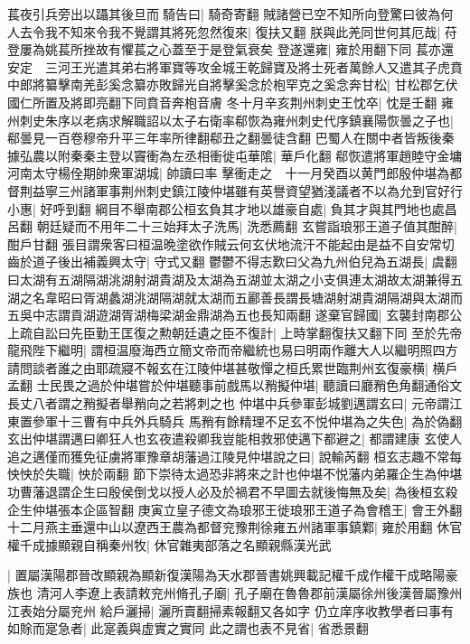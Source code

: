 萇夜引兵旁出以躡其後旦而騎告曰|{
	騎奇寄翻}
賊諸營已空不知所向登驚曰彼為何人去令我不知來令我不覺謂其將死忽然復來|{
	復扶又翻}
朕與此羌同世何其厄哉|{
	苻登屢為姚萇所挫故有懼萇之心蓋至于是登氣衰矣}
登遂還雍|{
	雍於用翻下同}
萇亦還安定　三河王光遣其弟右將軍寶等攻金城王乾歸寶及將士死者萬餘人又遣其子虎賁中郎將纂擊南羌彭奚念纂亦敗歸光自將擊奚念於枹罕克之奚念奔甘松|{
	甘松郡乞伏國仁所置及將即亮翻下同賁音奔枹音膚}
冬十月辛亥荆州刺史王忱卒|{
	忱是壬翻}
雍州刺史朱序以老病求解職詔以太子右衛率郗恢為雍州刺史代序鎮襄陽恢曇之子也|{
	郗曇見一百卷穆帝升平三年率所律翻郗丑之翻曇徒含翻}
巴蜀人在關中者皆叛後秦據弘農以附秦秦主登以竇衝為左丞相衝徙屯華隂|{
	華戶化翻}
郗恢遣將軍趙睦守金墉河南太守楊佺期帥衆軍湖城|{
	帥讀曰率}
擊衝走之　十一月癸酉以黄門郎殷仲堪為都督荆益寧三州諸軍事荆州刺史鎮江陵仲堪雖有英譽資望猶淺議者不以為允到官好行小惠|{
	好呼到翻}
綱目不舉南郡公桓玄負其才地以雄豪自處|{
	負其才與其門地也處昌呂翻}
朝廷疑而不用年二十三始拜太子洗馬|{
	洗悉薦翻}
玄嘗詣琅邪王道子值其酣醉|{
	酣戶甘翻}
張目謂衆客曰桓温晩塗欲作賊云何玄伏地流汗不能起由是益不自安常切齒於道子後出補義興太守|{
	守式又翻}
鬱鬱不得志歎曰父為九州伯兒為五湖長|{
	虞翻曰太湖有五湖隔湖洮湖射湖貴湖及太湖為五湖並太湖之小支俱連太湖故太湖兼得五湖之名韋昭曰胥湖蠡湖洮湖隔湖就太湖而五酈善長謂長塘湖射湖貴湖隔湖與太湖而五吳中志謂貢湖遊湖胥湖梅梁湖金鼎湖為五也長知兩翻}
遂棄官歸國|{
	玄襲封南郡公}
上疏自訟曰先臣勤王匡復之勲朝廷遺之臣不復計|{
	上時掌翻復扶又翻下同}
至於先帝龍飛陛下繼明|{
	謂桓温廢海西立簡文帝而帝繼統也易曰明兩作離大人以繼明照四方}
請問談者誰之由耶疏寢不報玄在江陵仲堪甚敬憚之桓氏累世臨荆州玄復豪横|{
	横戶孟翻}
士民畏之過於仲堪嘗於仲堪聽事前戲馬以矟擬仲堪|{
	聽讀曰廳矟色角翻通俗文長丈八者謂之矟擬者舉矟向之若將刺之也}
仲堪中兵參軍彭城劉邁謂玄曰|{
	元帝謂江東置參軍十三曹有中兵外兵騎兵}
馬矟有餘精理不足玄不悦仲堪為之失色|{
	為於偽翻}
玄出仲堪謂邁曰卿狂人也玄夜遣殺卿我豈能相救邪使邁下都避之|{
	都謂建康}
玄使人追之邁僅而獲免征虜將軍豫章胡藩過江陵見仲堪說之曰|{
	說輸芮翻}
桓玄志趣不常每怏怏於失職|{
	怏於兩翻}
節下崇待太過恐非將來之計也仲堪不悦藩内弟羅企生為仲堪功曹藩退謂企生曰殷侯倒戈以授人必及於禍君不早圖去就後悔無及矣|{
	為後桓玄殺企生仲堪張本企區智翻}
庚寅立皇子德文為琅邪王徙琅邪王道子為會稽王|{
	會王外翻}
十二月燕主垂還中山以遼西王農為都督兖豫荆徐雍五州諸軍事鎮鄴|{
	雍於用翻}
休官權千成據顯親自稱秦州牧|{
	休官雜夷部落之名顯親縣漢光武}


|{
	置屬漢陽郡晉改顯親為顯新復漢陽為天水郡晉書姚興載記權千成作權干成略陽豪族也}
清河人李遼上表請敕兖州脩孔子廟|{
	孔子廟在魯魯郡前漢屬徐州後漢晉屬豫州江表始分屬兖州}
給戶灑掃|{
	灑所賣翻掃素報翻又各如字}
仍立庠序收教學者曰事有如賖而寔急者|{
	此寔義與虚實之實同}
此之謂也表不見省|{
	省悉景翻}


